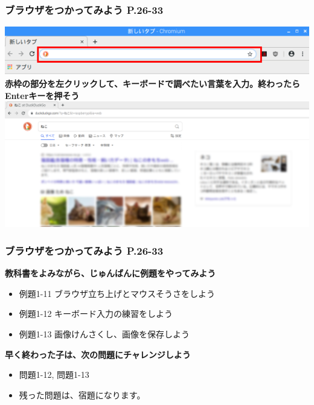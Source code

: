 \documentclass[dvipdfmx]{beamer}
\begin{document}
\begin{frame}[fragile]
	\frametitle{ブラウザをつかってみよう P.26-33~~~}
  \includegraphics[width=\textwidth]{slide02_005.png}
  \vfill
  \large\textbf{赤枠の部分を左クリックして、キーボードで調べたい言葉を入力。終わったらEnterキーを押そう}\\
  \vfill
  \includegraphics[width=\textwidth]{slide02_006.png}\\
\end{frame}

\begin{frame}[fragile]
	\frametitle{ブラウザをつかってみよう P.26-33~~~}
    \large\textbf{教科書をよみながら、じゅんばんに例題をやってみよう}
    				\begin{itemize}
    					\item 例題1-11 ブラウザ立ち上げとマウスそうさをしよう
    					\item 例題1-12 キーボード入力の練習をしよう
    					\item 例題1-13 画像けんさくし、画像を保存しよう
    				\end{itemize}
          \vfill
          \large\textbf{早く終わった子は、次の問題にチャレンジしよう}
          \begin{itemize}
            \item 問題1-12, 問題1-13
            \item 残った問題は、宿題になります。
          \end{itemize}
\end{frame}
\end{document}
